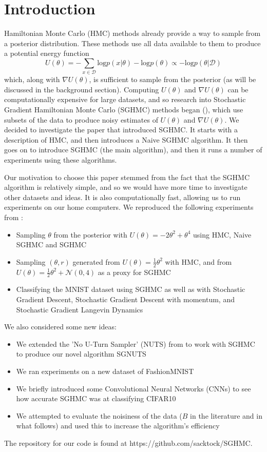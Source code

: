 
\section{Introduction}

Hamiltonian Monte Carlo (HMC) methods already provide a way to sample from a posterior distribution. These methods use all data available to them to produce a potential energy function $$U(\theta) = - \sum_{x\in\mathcal{D}}\text{log}p(x| \theta) - \text{log}p(\theta ) \propto -\text{log}p(\theta | \mathcal{D})$$
which, along with $\nabla U(\theta)$, is sufficient to sample from the posterior (as will be discussed in the background section). Computing $U(\theta)$ and $\nabla U(\theta)$ can be computationally expensive for large datasets, and so research into Stochastic Gradient Hamiltonian Monte Carlo (SGHMC) methods began (\cite{sghmc}), which use subsets of the data to produce noisy estimates of $U(\theta)$ and $\nabla U(\theta)$. We decided to investigate the paper that introduced SGHMC. It starts with a description of HMC, and then introduces a Naive SGHMC algorithm. It then goes on to introduce SGHMC (the main algorithm), and then it runs a number of experiments using these algorithms.

Our motivation to choose this paper stemmed from the fact that the SGHMC algorithm is relatively simple, and so we would have more time to investigate other datasets and ideas. It is also computationally fast, allowing us to run experiments on our home computers. We reproduced the following experiments from \cite{sghmc}:

\begin{itemize}
    \item Sampling $\theta$ from the posterior with $U(\theta) = -2\theta^2 + \theta^4$ using HMC, Naive SGHMC and SGHMC
    \item Sampling $(\theta,r)$ generated from $U(\theta) = \frac{1}{2}\theta^2$ with HMC, and from $U(\theta) = \frac{1}{2}\theta^2 + \mathcal{N}(0,4)$ as a proxy for SGHMC
    \item Classifying the MNIST dataset using SGHMC as well as with Stochastic Gradient Descent, Stochastic Gradient Descent with momentum, and Stochastic Gradient Langevin Dynamics
\end{itemize}

We also considered some new ideas:

\begin{itemize}
    \item We extended the 'No U-Turn Sampler' (NUTS) from \cite{nuts} to work with SGHMC to produce our novel algorithm SGNUTS
    \item We ran experiments on a new dataset of FashionMNIST
    \item We briefly introduced some Convolutional Neural Networks (CNNs) to see how accurate SGHMC was at classifying CIFAR10
    \item We attempted to evaluate the noisiness of the data ($B$ in the literature and in what follows) and used this to increase the algorithm's efficiency
\end{itemize}

The repository for our code is found at https://github.com/sacktock/SGHMC.
